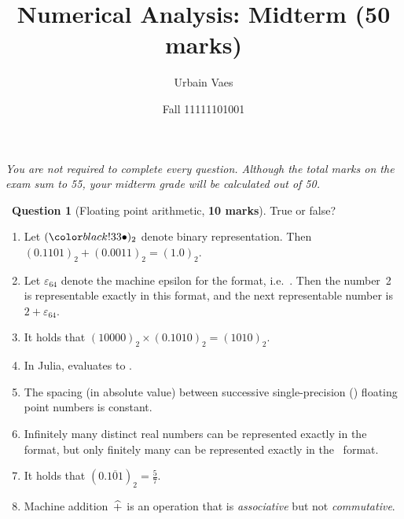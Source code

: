 \documentclass[10pt]{article}
\theoremstyle{definition}
\newtheorem{question}{{\normalfont \faGears}~Question}
\renewcommand{\mymarks}[1]{\textbf{#1 marks}}
\begin{document}
\title{Numerical Analysis: Midterm {\small (\mymarks{50})}}
\author{Urbain Vaes}
\date{Fall 11111101001}
\maketitle

\noindent \emph{You are not required to complete every question. Although the total marks on the exam sum to 55, your midterm grade will be calculated out of 50.}
\vspace{.5cm}

\begin{question}
    [Floating point arithmetic, \mymarks{10}]
    True or false?
    \begin{enumerate}
        \item Let $(\placeholder)_2$ denote binary representation.
            Then
            \(
                (0.1101)_2 + (0.0011)_2 = (1.0)_2.
            \)

        \item
            Let $\varepsilon_{64}$ denote the machine epsilon for the  format,
            i.e.\ .
            Then the number~2 is representable exactly in this format,
            and the next representable number is $2 + \varepsilon_{64}$.

        \item It holds that
            \(
                (10000)_2 \times (0.1010)_2 = (1010)_2.
            \)
        \item 
            In Julia,  evaluates to .

        \item 
            The spacing (in absolute value) between successive single-precision () floating point numbers is constant.

        \item
            Infinitely many distinct real numbers can be represented exactly in the~ format,
            but only finitely many can be represented exactly in the~ format.

        \item 
            It holds that $(0.\overline{101})_2 = \frac{5}{7}$.

        \item 
            Machine addition~$\mathbin{\widehat +}$ is an operation that is \emph{associative} but not \emph{commutative}.


\end{enumerate}
\end{question}
\end{document}

